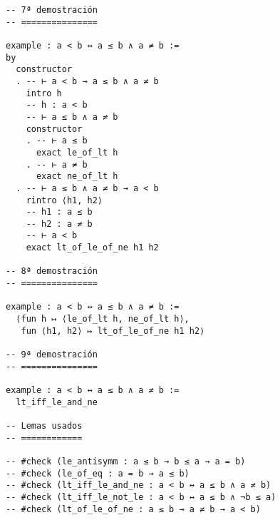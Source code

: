\begin{verbatim}
-- 7ª demostración
-- ===============

example : a < b ↔ a ≤ b ∧ a ≠ b :=
by
  constructor
  . -- ⊢ a < b → a ≤ b ∧ a ≠ b
    intro h
    -- h : a < b
    -- ⊢ a ≤ b ∧ a ≠ b
    constructor
    . -- ⊢ a ≤ b
      exact le_of_lt h
    . -- ⊢ a ≠ b
      exact ne_of_lt h
  . -- ⊢ a ≤ b ∧ a ≠ b → a < b
    rintro ⟨h1, h2⟩
    -- h1 : a ≤ b
    -- h2 : a ≠ b
    -- ⊢ a < b
    exact lt_of_le_of_ne h1 h2

-- 8ª demostración
-- ===============

example : a < b ↔ a ≤ b ∧ a ≠ b :=
  ⟨fun h ↦ ⟨le_of_lt h, ne_of_lt h⟩,
   fun ⟨h1, h2⟩ ↦ lt_of_le_of_ne h1 h2⟩

-- 9ª demostración
-- ===============

example : a < b ↔ a ≤ b ∧ a ≠ b :=
  lt_iff_le_and_ne

-- Lemas usados
-- ============

-- #check (le_antisymm : a ≤ b → b ≤ a → a = b)
-- #check (le_of_eq : a = b → a ≤ b)
-- #check (lt_iff_le_and_ne : a < b ↔ a ≤ b ∧ a ≠ b)
-- #check (lt_iff_le_not_le : a < b ↔ a ≤ b ∧ ¬b ≤ a)
-- #check (lt_of_le_of_ne : a ≤ b → a ≠ b → a < b)
\end{verbatim}

